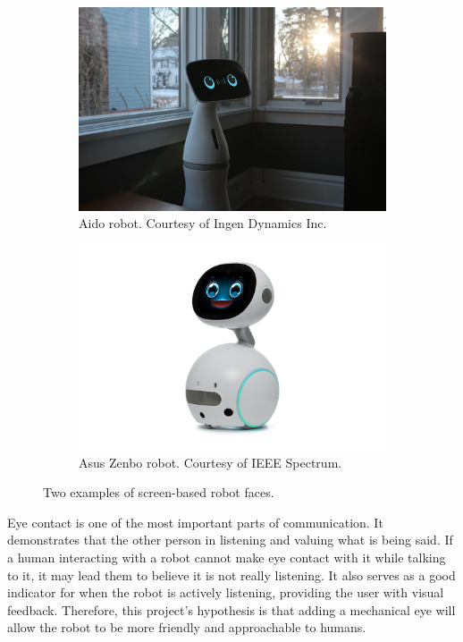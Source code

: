 \begin{figure}[h]
    \centering
    \begin{subfigure}{0.4\linewidth}
        \includegraphics[width=\textwidth]{Thesis/ch1/aido.png}
        \caption{Aido robot. Courtesy of Ingen Dynamics Inc.}
    \end{subfigure}
    \begin{subfigure}{0.4\linewidth}
        \includegraphics[width=\textwidth]{Thesis/ch1/zenbo-junior.png}
        \caption{Asus Zenbo robot. Courtesy of IEEE Spectrum.}
    \end{subfigure}
    \caption{Two examples of screen-based robot faces.}
    \label{fig:aido-zenbo}
\end{figure}

Eye contact is one of the most important parts of communication. It demonstrates that the other person in listening and valuing what is being said. If a human interacting with a robot cannot make eye contact with it while talking to it, it may lead them to believe it is not really listening. It also serves as a good indicator for when the robot is actively listening, providing the user with visual feedback. Therefore, this project's hypothesis is that adding a mechanical eye will allow the robot to be more friendly and approachable to humans.


